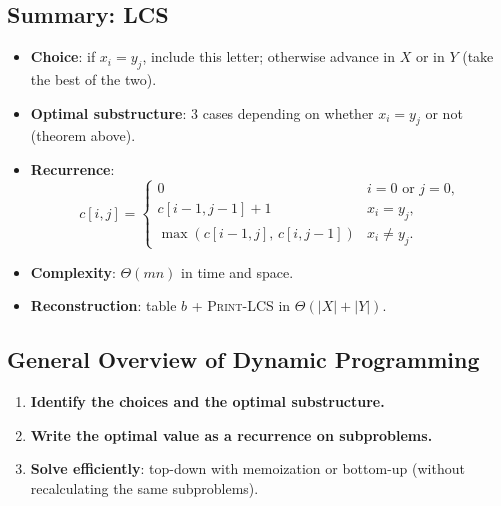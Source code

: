 \subsection{Summary: LCS}

\begin{tcolorbox}[colback=lightblue, colframe=keyblue, fonttitle=\bfseries,
                  title={Summary DP – Longest Common Subsequence}]
\begin{itemize}[noitemsep]
  \item \textbf{Choice}: if $x_i = y_j$, include this letter; otherwise advance in
        $X$ or in $Y$ (take the best of the two).
  \item \textbf{Optimal substructure}: 3 cases depending on whether $x_i = y_j$ or not
        (theorem above).
  \item \textbf{Recurrence}:
    \[
      c[i,j] =
      \begin{cases}
        0 & i = 0 \text{ or } j = 0,\\
        c[i-1,j-1]+1 & x_i = y_j,\\
        \max(c[i-1,j],\,c[i,j-1]) & x_i \ne y_j.
      \end{cases}
    \]
  \item \textbf{Complexity}: $\Theta(mn)$ in time and space.
  \item \textbf{Reconstruction}: table $b$ + \textsc{Print-LCS} in $\Theta(|X|+|Y|)$.
\end{itemize}
\end{tcolorbox}

\subsection{General Overview of Dynamic Programming}

\begin{tcolorbox}[colback=lightyellow, colframe=orange!70!black, fonttitle=\bfseries,
                  title={DP Recipe in Three Steps}]
\begin{enumerate}
  \item \textbf{Identify the choices and the optimal substructure.}
  \item \textbf{Write the optimal value as a recurrence on subproblems.}
  \item \textbf{Solve efficiently}: top-down with memoization or bottom-up
        (without recalculating the same subproblems).
\end{enumerate}
\end{tcolorbox}

